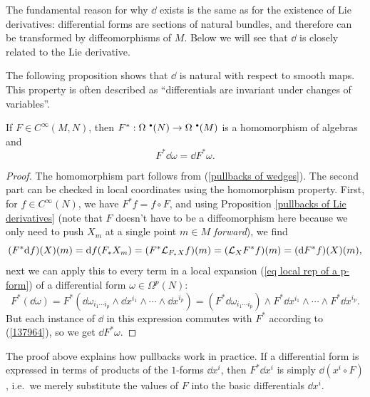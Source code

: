 The fundamental reason for why $\dd$ exists is the same as for the existence of Lie derivatives: differential forms are sections of natural bundles, and therefore can be transformed by diffeomorphisms of $M$. Below we will see that $\dd$ is closely related to the Lie derivative.

The following proposition shows that $\dd$ is natural with respect to smooth maps. This property is often described as ``differentials are invariant under changes of variables''.

\begin{prop}
    If $F\in C^\infty(M,N)$, then $F^\ast:\Omega^{\smbullet }(N)\to\Omega^{\smbullet }(M)$ is a homomorphism of algebras and
    \[F^\ast \dd\omega=\dd F^\ast\omega.\]
\end{prop}
\begin{proof}
    The homomorphism part follows from (\ref{pullbacks of wedges}). The second part can be checked in local coordinates using the homomorphism property. First, for $f\in C^\infty(N)$, we have $F^\ast f=f\circ F$, and using Proposition \ref{pullbacks of Lie derivatives} (note that $F$ doesn't have to be a diffeomorphism here because we only need to push $X_m$ at a single point $m\in M$ \emph{forward}), we find
    \[(F^\ast {\mathrm{d}} f)(X)(m)={\mathrm{d}} f(F_\ast X_m)=(F^\ast \mathcal{L}_{F_\ast X}f)(m)=(\mathcal{L}_X F^\ast f)(m)=({\mathrm{d}} F^\ast f)(X)(m),\label{137964}\]
    next we can apply this to every term in a local expansion (\ref{eq local rep of a p-form}) of a differential form $\omega\in\Omega^p(N)$:
    \[F^\ast(\dd\omega)=F^\ast(\dd\omega_{i_1\cdots i_p}\wedge \dd x^{i_1}\wedge\cdots \wedge \dd x^{i_p})=(F^\ast\dd\omega_{i_1\cdots i_p})\wedge F^\ast \dd x^{i_1}\wedge\cdots\wedge F^\ast \dd x^{i_p}.\]
    But each instance of $\dd$ in this expression commutes with $F^\ast$ according to (\ref{137964}), so we get $\dd F^\ast\omega$.
\end{proof}

\begin{rem}
    The proof above explains how pullbacks work in practice. If a differential form is expressed in terms of products of the $1$-forms $\dd x^i$, then $F^\ast\dd x^i$ is simply $\dd (x^i\circ F)$, i.e.\ we merely substitute the values of $F$ into the basic differentials $\dd x^i$.
\end{rem}

